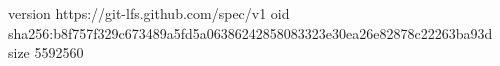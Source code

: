 version https://git-lfs.github.com/spec/v1
oid sha256:b8f757f329c673489a5fd5a06386242858083323e30ea26e82878c22263ba93d
size 5592560
